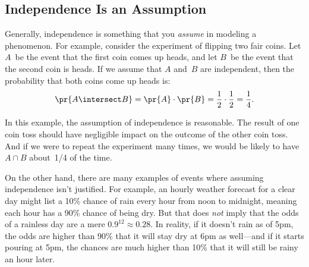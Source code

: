 \subsection{Independence Is an Assumption}

Generally, independence is something that you \emph{assume} in
modeling a phenomenon.  For example, consider the experiment of
flipping two fair coins.  Let $A$~be the event that the first coin
comes up heads, and let $B$~be the event that the second coin is
heads.  If we assume that $A$ and~$B$ are independent, then the
probability that both coins come up heads is:
%
\begin{equation*}
\pr{A \intersect B}  = \pr{A} \cdot \pr{B} %
               = \frac{1}{2} \cdot \frac{1}{2} %
               = \frac{1}{4}.
\end{equation*}

In this example, the assumption of independence is reasonable.  The
result of one coin toss should have negligible impact on the outcome
of the other coin toss.  And if we were to repeat the experiment many
times, we would be likely to have~$A \cap B$ about~1/4 of the time.

On the other hand, there are many examples of events where assuming
independence isn't justified.  For example, an hourly weather forecast
for a clear day might list a 10\% chance of rain every hour from noon
to midnight, meaning each hour has a 90\% chance of being dry.  But
that does \emph{not} imply that the odds of a rainless day are a mere
$0.9^{12} \approx 0.28$.  In reality, if it doesn't rain as of 5pm,
the odds are higher than 90\% that it will stay dry at 6pm as
well---and if it starts pouring at 5pm, the chances are much higher
than 10\% that it will still be rainy an hour later.

